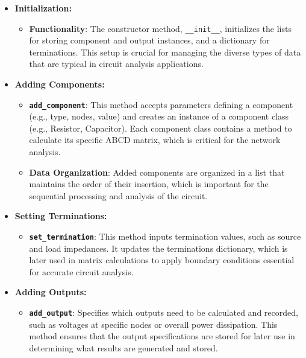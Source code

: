 \documentclass[conference]{IEEEtran}
\begin{document}
\begin{itemize}
      \item \textbf{Initialization:}
            \begin{itemize}
                  \item \textbf{Functionality}: The constructor method, \texttt{\_\_init\_\_}, initializes the lists for storing component
                        and output instances, and a dictionary for terminations. This setup is crucial for managing the diverse types of data that
                        are typical in circuit analysis applications.
            \end{itemize}

      \item \textbf{Adding Components:}
            \begin{itemize}
                  \item \textbf{\texttt{add\_component}}: This method accepts parameters defining a component (e.g., type, nodes, value) and
                        creates an instance of a component class (e.g., Resistor, Capacitor). Each component class contains a method to calculate its
                        specific ABCD matrix, which is critical for the network analysis.
                  \item \textbf{Data Organization}: Added components are organized in a list that maintains the order of their insertion, which
                        is important for the sequential processing and analysis of the circuit.
            \end{itemize}

      \item \textbf{Setting Terminations:}
            \begin{itemize}
                  \item \textbf{\texttt{set\_termination}}: This method inputs termination values, such as source and load impedances. It
                        updates the terminations dictionary, which is later used in matrix calculations to apply boundary conditions essential
                        for accurate circuit analysis.
            \end{itemize}

      \item \textbf{Adding Outputs:}
            \begin{itemize}
                  \item \textbf{\texttt{add\_output}}: Specifies which outputs need to be calculated and recorded, such as voltages at
                        specific nodes or overall power dissipation. This method ensures that the output specifications are stored for later use
                        in determining what results are generated and stored.
            \end{itemize}


\end{itemize}
\end{document}
